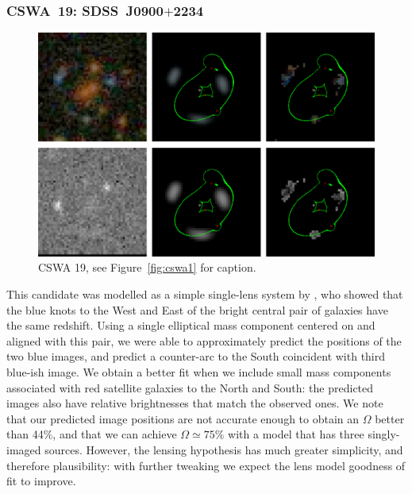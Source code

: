 \documentclass[iop]{emulateapj}
\begin{document}

\subsubsection*{CSWA~19: SDSS\ J0900$+$2234}
\label{sec:results:indinotes:cswa19}


\begin{figure}[!ht]
	\centering\includegraphics[width=\linewidth]{figs/19.eps}
	\caption{CSWA 19, see Figure~\ref{fig:cswa1} for caption.}
	\label{fig:cswa19}
\end{figure}

This candidate was modelled as a simple single-lens system by \citet{Die++09}, 
who showed that the blue knots to the West and East of the bright central pair
of galaxies have the same redshift. Using a single elliptical mass component
centered on and aligned with this pair, we were able to approximately predict
the positions of the  two blue images, and predict a counter-arc to the South
coincident with third blue-ish image. We obtain a better fit when we include
small mass components associated with red satellite galaxies to the North and
South: the predicted images also have relative brightnesses that match the
observed ones. We note that our predicted image positions  are not accurate
enough to obtain an $\Omega$ better than 44\%, and that we can achieve  $\Omega
\simeq 75\%$ with a model that has three singly-imaged sources. However, the
lensing hypothesis has much greater simplicity, and therefore plausibility: with
further  tweaking we expect the lens model goodness of fit to improve.
\end{document}
